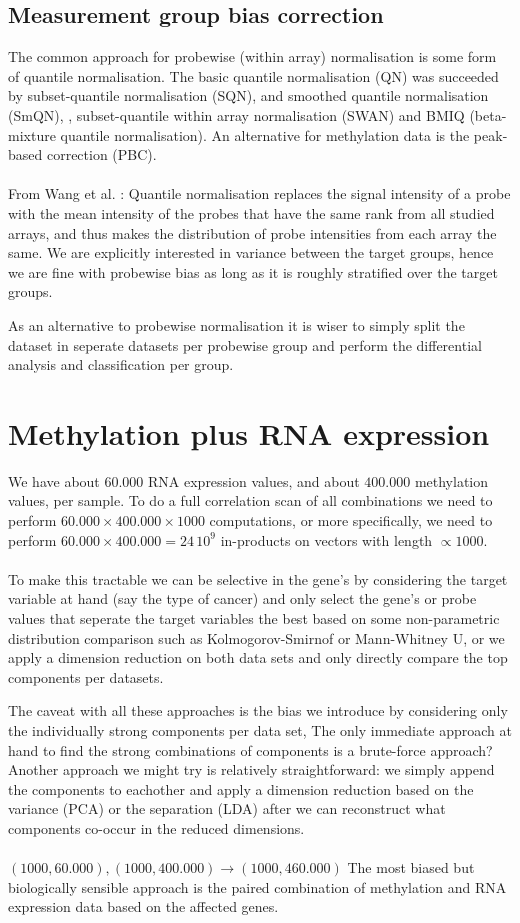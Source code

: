 \documentclass[a4paper,10pt]{article}
\begin{document}
\subsection{Measurement group bias correction}
%
The common approach for probewise (within array) normalisation is some form 
of quantile normalisation. The basic quantile normalisation (QN) 
was succeeded by subset-quantile normalisation (SQN), and smoothed quantile normalisation (SmQN),
, subset-quantile within array normalisation (SWAN) and BMIQ (beta-mixture quantile normalisation).
An alternative for methylation data is the peak-based correction (PBC). \\ \\ 
%
From Wang et al. \cite{Wang2015}: Quantile normalisation replaces the signal intensity of a probe with the mean intensity of the probes that have the same rank from all studied arrays, and thus makes the distribution of probe intensities from each array the same. We are explicitly interested in variance between the target groups, hence we are fine with probewise bias as long as it is roughly stratified over the target groups. 




As an alternative to probewise normalisation it is wiser to simply split the dataset in seperate datasets per probewise group and perform the
differential analysis and classification per group.
%
\section{Methylation plus RNA expression}
%
We have about $60.000$ RNA expression values, and about $400.000$ methylation values, per sample.
To do a full correlation scan of all combinations we need to perform $60.000\times 400.000 \times 1000$ computations, 
or more specifically, we need to perform $60.000\times 400.000=24\,10^9$ in-products on vectors with length $\propto 1000$. \\ \\
%
To make this tractable we can be selective in the gene's by considering the target variable at hand (say the type 
of cancer) and only select the gene's or probe values that seperate the target variables the best based 
on some non-parametric distribution comparison such as Kolmogorov-Smirnof or Mann-Whitney U, or we apply 
a dimension reduction on both data sets and only directly compare  the top components per datasets.

The caveat with all these approaches is the bias we introduce by considering only the individually strong components per data set, 
The only immediate approach at hand to find the strong combinations of components is a brute-force approach?
Another approach we might try is relatively straightforward: we simply append the components to eachother and apply a
dimension reduction based on the variance (PCA) or the separation (LDA) after we can reconstruct what
components co-occur in the reduced dimensions. \\ \\
%
$(1000, 60.000),(1000, 400.000) \rightarrow (1000, 460.000)$
%
The most biased but biologically sensible approach is the paired combination of methylation and RNA expression data
based on the affected genes. 
\end{document}
